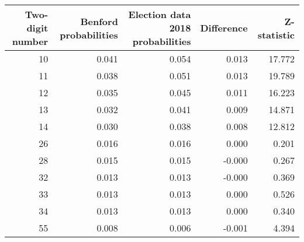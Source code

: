 \begin{tabular}{rrrrr}
\toprule
Two-digit number & Benford probabilities & Election data 2018 probabilities & Difference & Z-statistic \\
\midrule
10 & 0.041 & 0.054 & 0.013 & 17.772 \\
11 & 0.038 & 0.051 & 0.013 & 19.789 \\
12 & 0.035 & 0.045 & 0.011 & 16.223 \\
13 & 0.032 & 0.041 & 0.009 & 14.871 \\
14 & 0.030 & 0.038 & 0.008 & 12.812 \\
26 & 0.016 & 0.016 & 0.000 & 0.201 \\
28 & 0.015 & 0.015 & -0.000 & 0.267 \\
32 & 0.013 & 0.013 & -0.000 & 0.369 \\
33 & 0.013 & 0.013 & 0.000 & 0.526 \\
34 & 0.013 & 0.013 & 0.000 & 0.340 \\
55 & 0.008 & 0.006 & -0.001 & 4.394 \\
\bottomrule
\end{tabular}
